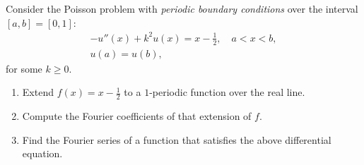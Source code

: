 \documentclass[11pt]{article}
\begin{document}
\begin{exercise}
    Consider the Poisson problem with \textit{periodic boundary conditions} over the interval $[a,b] = [0,1]$: 
    \begin{gather*}
        - u''(x) + k^2 u(x) = x - \frac 1 2, \quad a < x < b,
        \\
        u(a) = u(b),
    \end{gather*}
    for some $k \geq 0$.
    \begin{enumerate}[label=(\alph*)]
        \item
        Extend $f(x) = x - \frac 1 2$ to a $1$-periodic function over the real line.
        \item 
        Compute the Fourier coefficients of that extension of $f$.
        \item 
        Find the Fourier series of a function that satisfies the above differential equation.
    \end{enumerate}
\end{exercise}
\end{document}
